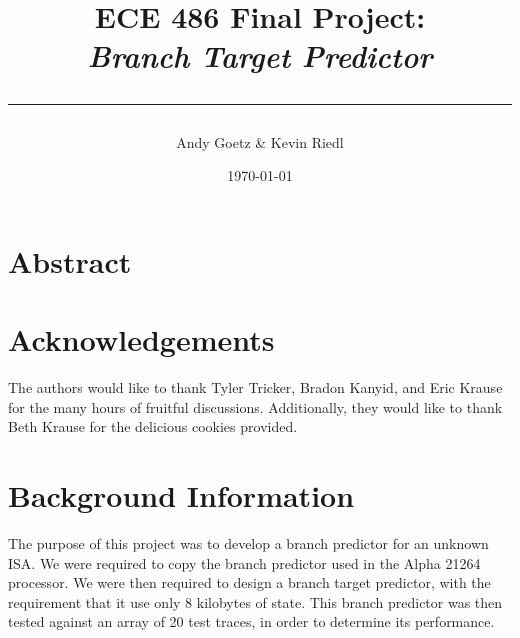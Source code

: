 \documentclass[twocolumn]{article}
\author{\LARGE Andy Goetz \& Kevin Riedl}
\date{\today}
\title{\Huge \textbf{ECE 486 Final Project:} \\ \it{Branch Target Predictor} \\ \rule{\linewidth}{0.5mm}}
\begin{document}
\maketitle
\section{Abstract}
\section{Acknowledgements}

The authors would like to thank Tyler Tricker, Bradon Kanyid, and Eric
Krause for the many hours of fruitful discussions. Additionally, they
would like to thank Beth Krause for the delicious cookies provided.

\section{Background Information}
The purpose of this project was to develop a branch predictor for an
unknown ISA. We were required to copy the branch predictor used in the
Alpha 21264 processor. We were then required to design a branch target
predictor, with the requirement that it use only 8 kilobytes of
state. This branch predictor was then tested against an array of 20
test traces, in order to determine its performance. 
\end{document}
